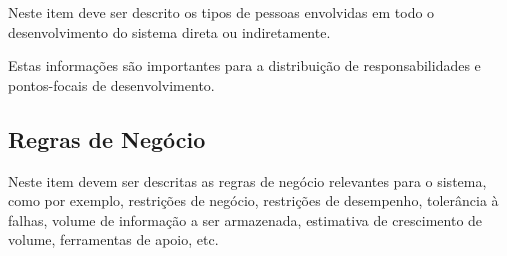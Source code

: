 Neste item deve ser descrito os tipos de pessoas envolvidas em todo o desenvolvimento do sistema direta ou indiretamente.

Estas informações são importantes para a distribuição de responsabilidades e pontos-focais de desenvolvimento.

\subsection{Regras de Negócio}

Neste item devem ser descritas as regras de negócio relevantes para o sistema, como por exemplo, restrições de negócio, restrições de desempenho, tolerância à falhas, volume de informação a ser armazenada, estimativa de crescimento de volume, ferramentas de apoio, etc.
